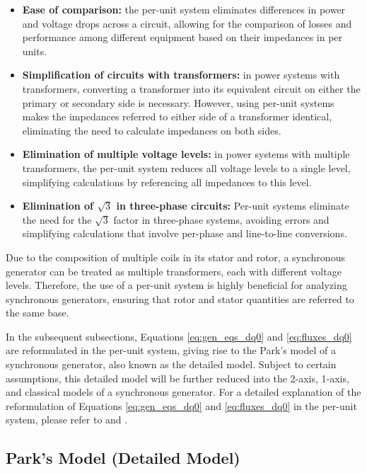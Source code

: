 \begin{itemize}
    \item \textbf{Ease of comparison:} the per-unit system eliminates differences
    in power and voltage drops across a circuit, allowing for the comparison of
    losses and performance among different equipment based on their impedances
    in per units.
    \item \textbf{Simplification of circuits with transformers:} in power
    systems with transformers, converting a transformer into its equivalent
    circuit on either the primary or secondary side is necessary. However, using
    per-unit systems makes the impedances referred to either side of a
    transformer identical, eliminating the need to calculate impedances on both
    sides.
    \item \textbf{Elimination of multiple voltage levels:} in power systems with
    multiple transformers, the per-unit system reduces all voltage levels to a
    single level, simplifying calculations by referencing all impedances to this
    level.
    \item \textbf{Elimination of $\sqrt{3}$ in three-phase circuits:} Per-unit
    systems eliminate the need for the $\sqrt{3}$ factor in three-phase systems,
    avoiding errors and simplifying calculations that involve per-phase and
    line-to-line conversions.
\end{itemize}

Due to the composition of multiple coils in its stator and rotor, a synchronous
generator can be treated as multiple transformers, each with different voltage
levels. Therefore, the use of a per-unit system is highly beneficial for
analyzing synchronous generators, ensuring that rotor and stator quantities are
referred to the same base. 

In the subsequent subsections, Equations \ref{eq:gen_eqs_dq0} and
\ref{eq:fluxes_dq0} are reformulated in the per-unit system, giving rise to the
Park's model of a synchronous generator, also known as the detailed model.
Subject to certain assumptions, this detailed model will be further reduced into
the 2-axis, 1-axis, and classical models of a synchronous generator. For a
detailed explanation of the reformulation of Equations \ref{eq:gen_eqs_dq0} and
\ref{eq:fluxes_dq0} in the per-unit system, please refer to
\cite{sauer2017power} and \cite{siva2022modeling}.

\subsection{Park's Model (Detailed Model)}

